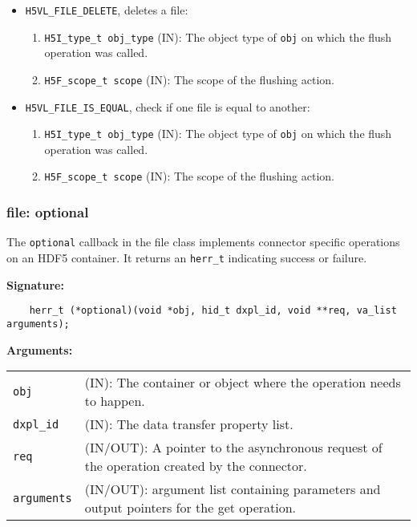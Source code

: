 \begin{mdframed}[style=bgbox]
\begin{itemize}
\item \texttt{H5VL\_FILE\_DELETE}, deletes a file:
  \begin{enumerate}
  \item \texttt{H5I\_type\_t obj\_type} (IN): The object type of \texttt{obj} on which the flush operation was called.
  \item \texttt{H5F\_scope\_t scope} (IN): The scope of the flushing action.
  \end{enumerate}

\item \texttt{H5VL\_FILE\_IS\_EQUAL}, check if one file is equal to another:
  \begin{enumerate}
  \item \texttt{H5I\_type\_t obj\_type} (IN): The object type of \texttt{obj} on which the flush operation was called.
  \item \texttt{H5F\_scope\_t scope} (IN): The scope of the flushing action.
  \end{enumerate}

 \end{itemize}
\end{mdframed}

\subsubsection{file: optional}
The \texttt{optional} callback in the file class implements connector specific operations on an HDF5 container. It returns an 
\texttt{herr\_t} indicating success or failure. \bigskip
\begin{mdframed}[style=bgbox] 
\textbf{Signature:}
\begin{lstlisting}
    herr_t (*optional)(void *obj, hid_t dxpl_id, void **req, va_list arguments);
\end{lstlisting}

\textbf{Arguments:}\\
\begin{tabular}{l p{13.5cm}}
  \texttt{obj} & (IN): The container or object where the operation needs to happen.\\
  \texttt{dxpl\_id} & (IN): The data transfer property list.\\
  \texttt{req} & (IN/OUT): A pointer to the asynchronous request of the operation created by the connector.\\
  \texttt{arguments} & (IN/OUT): argument list containing parameters and output pointers for the get operation. \\
\end{tabular}
\end{mdframed}

